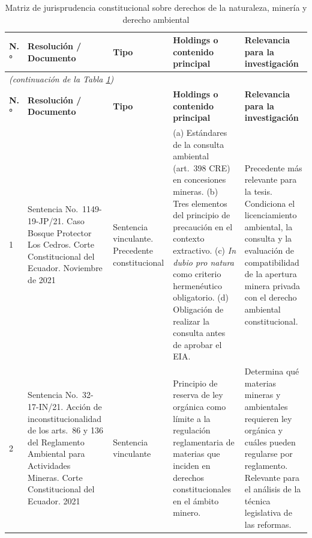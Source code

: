 
\begingroup
\small
\begin{longtable}{|p{}|p{}|p{}|p{}|p{}|}

\caption{Matriz de jurisprudencia constitucional sobre derechos de la naturaleza, minería y derecho ambiental}
\label{tab:jurisprudencial} \\

\hline
\textbf{N.°} & \textbf{Resolución / Documento} & \textbf{Tipo} & \textbf{Holdings o contenido principal} & \textbf{Relevancia para la investigación} \\
\hline
\endfirsthead

\multicolumn{5}{l}{\small\textit{(continuación de la Tabla \ref*{tab:jurisprudencial})}} \\[2pt]
\hline
\textbf{N.°} & \textbf{Resolución / Documento} & \textbf{Tipo} & \textbf{Holdings o contenido principal} & \textbf{Relevancia para la investigación} \\
\hline
\endhead

\hline
\endfoot

1 &
Sentencia No.\ 1149-19-JP/21. Caso Bosque Protector Los Cedros. Corte Constitucional del Ecuador. Noviembre de 2021 &
Sentencia vinculante. Precedente constitucional &
(a) Estándares de la consulta ambiental (art.\ 398 CRE) en concesiones mineras. (b) Tres elementos del principio de precaución en el contexto extractivo. (c) \textit{In dubio pro natura} como criterio hermenéutico obligatorio. (d) Obligación de realizar la consulta antes de aprobar el EIA. &
Precedente más relevante para la tesis. Condiciona el licenciamiento ambiental, la consulta y la evaluación de compatibilidad de la apertura minera privada con el derecho ambiental constitucional. \\
\hline

2 &
Sentencia No.\ 32-17-IN/21. Acción de inconstitucionalidad de los arts.\ 86 y 136 del Reglamento Ambiental para Actividades Mineras. Corte Constitucional del Ecuador. 2021 &
Sentencia vinculante &
Principio de reserva de ley orgánica como límite a la regulación reglamentaria de materias que inciden en derechos constitucionales en el ámbito minero. &
Determina qué materias mineras y ambientales requieren ley orgánica y cuáles pueden regularse por reglamento. Relevante para el análisis de la técnica legislativa de las reformas. \\
\hline


\end{longtable}
